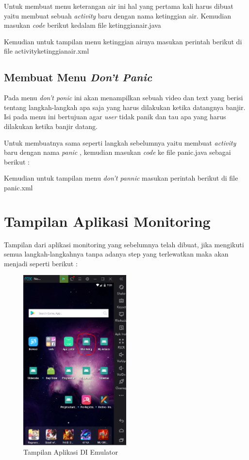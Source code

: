 \par Untuk membuat menu keterangan air ini hal yang pertama kali harus dibuat yaitu membuat sebuah \textit{activity} baru dengan nama ketinggian air. Kemudian masukan \textit{code} berikut kedalam file  ketinggianair.java

\par Kemudian untuk tampilan menu ketinggian airnya masukan perintah berikut di file activityketinggianair.xml


\subsection{Membuat Menu \textit{Don't Panic}}
\par Pada menu \textit{don't ponic} ini akan menampilkan sebuah video dan text yang berisi tentang langkah-langkah apa saja yang harus dilakukan ketika datangnya banjir. Isi pada menu ini bertujuan agar \textit{user} tidak panik dan tau apa yang harus dilakukan ketika banjir datang.

\par Untuk membuatnya sama seperti langkah sebelumnya yaitu membuat \textit{activity} baru dengan nama \textit{panic} , kemudian masukan \textit{code} ke file panic.java sebagai berikut :

\par Kemudian untuk tampilan menu \textit{don't pannic} masukan perintah berikut di file panic.xml


\section{Tampilan Aplikasi Monitoring}
\par Tampilan dari aplikasi monitoring yang sebelumnya telah dibuat, jika mengikuti semua langkah-langkahnya tanpa adanya step yang terlewatkan maka akan menjadi seperti berikut :

\begin{figure}[H]
        \centering
        \includegraphics[width=0.5\textwidth]{figures/nox.png}
        \caption{Tampilan Aplikasi DI Emulator}
        \label{print}
        \end{figure}

